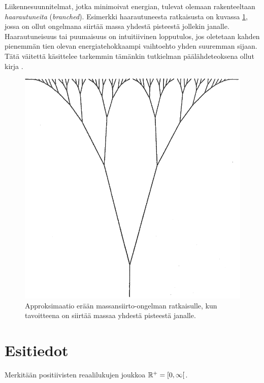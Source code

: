 \documentclass[12pt,oneside,a4paper]{amsbook} %
\begin{document}
Liikennesuunnitelmat, jotka minimoivat energian, tulevat olemaan rakenteeltaan \textit{haarautuneita} (\textit{branched}). Esimerkki haarautuneesta ratkaisusta on kuvassa \ref{fig:branched}, jossa on ollut ongelmana siirtää massa yhdestä pisteestä jollekin janalle. Haarautuneisuus tai puumaisuus on intuitiivinen lopputulos, jos oletetaan kahden pienemmän tien olevan energiatehokkaampi vaihtoehto yhden suuremman sijaan. Tätä väitettä käsittelee tarkemmin tämänkin tutkielman päälähdeteoksena ollut kirja \cite{optimal}.

\begin{figure}
    \centering
    \includegraphics[scale=0.25]{graphics/johdanto_branched.png}
    \caption{Approksimaatio erään massansiirto-ongelman ratkaisulle, kun tavoitteena on siirtää massaa yhdestä pisteestä janalle. \cite[s. 166]{optimal}}
    \label{fig:branched}
\end{figure}






\chapter{Esitiedot}
Merkitään positiivisten reaalilukujen joukkoa ${\mathbb{R}^{+}} = [0, \infty[$. 
\end{document}
